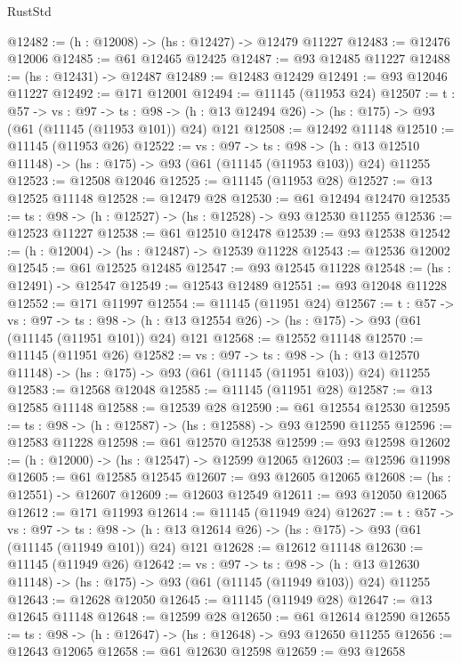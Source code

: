 \begin{lexlean}{RustStd}
\begin{coremodule}
@12482 := (h : @12008) -> (hs : @12427) -> @12479 @11227
@12483 := @12476 @12006
@12485 := @61 @12465 @12425
@12487 := @93 @12485 @11227
@12488 := (hs : @12431) -> @12487
@12489 := @12483 @12429
@12491 := @93 @12046 @11227
@12492 := @171 @12001
@12494 := @11145 (@11953 @24)
@12507 := {t : @57} ->
  {vs : @97} ->
  {ts : @98} -> (h : @13 @12494 @26) -> (hs : @175) -> @93 (@61 (@11145 (@11953 @101)) @24) @121
@12508 := @12492 @11148
@12510 := @11145 (@11953 @26)
@12522 := {vs : @97} ->
  {ts : @98} ->
  (h : @13 @12510 @11148) -> (hs : @175) -> @93 (@61 (@11145 (@11953 @103)) @24) @11255
@12523 := @12508 @12046
@12525 := @11145 (@11953 @28)
@12527 := @13 @12525 @11148
@12528 := @12479 @28
@12530 := @61 @12494 @12470
@12535 := {ts : @98} -> (h : @12527) -> (hs : @12528) -> @93 @12530 @11255
@12536 := @12523 @11227
@12538 := @61 @12510 @12478
@12539 := @93 @12538
@12542 := (h : @12004) -> (hs : @12487) -> @12539 @11228
@12543 := @12536 @12002
@12545 := @61 @12525 @12485
@12547 := @93 @12545 @11228
@12548 := (hs : @12491) -> @12547
@12549 := @12543 @12489
@12551 := @93 @12048 @11228
@12552 := @171 @11997
@12554 := @11145 (@11951 @24)
@12567 := {t : @57} ->
  {vs : @97} ->
  {ts : @98} -> (h : @13 @12554 @26) -> (hs : @175) -> @93 (@61 (@11145 (@11951 @101)) @24) @121
@12568 := @12552 @11148
@12570 := @11145 (@11951 @26)
@12582 := {vs : @97} ->
  {ts : @98} ->
  (h : @13 @12570 @11148) -> (hs : @175) -> @93 (@61 (@11145 (@11951 @103)) @24) @11255
@12583 := @12568 @12048
@12585 := @11145 (@11951 @28)
@12587 := @13 @12585 @11148
@12588 := @12539 @28
@12590 := @61 @12554 @12530
@12595 := {ts : @98} -> (h : @12587) -> (hs : @12588) -> @93 @12590 @11255
@12596 := @12583 @11228
@12598 := @61 @12570 @12538
@12599 := @93 @12598
@12602 := (h : @12000) -> (hs : @12547) -> @12599 @12065
@12603 := @12596 @11998
@12605 := @61 @12585 @12545
@12607 := @93 @12605 @12065
@12608 := (hs : @12551) -> @12607
@12609 := @12603 @12549
@12611 := @93 @12050 @12065
@12612 := @171 @11993
@12614 := @11145 (@11949 @24)
@12627 := {t : @57} ->
  {vs : @97} ->
  {ts : @98} -> (h : @13 @12614 @26) -> (hs : @175) -> @93 (@61 (@11145 (@11949 @101)) @24) @121
@12628 := @12612 @11148
@12630 := @11145 (@11949 @26)
@12642 := {vs : @97} ->
  {ts : @98} ->
  (h : @13 @12630 @11148) -> (hs : @175) -> @93 (@61 (@11145 (@11949 @103)) @24) @11255
@12643 := @12628 @12050
@12645 := @11145 (@11949 @28)
@12647 := @13 @12645 @11148
@12648 := @12599 @28
@12650 := @61 @12614 @12590
@12655 := {ts : @98} -> (h : @12647) -> (hs : @12648) -> @93 @12650 @11255
@12656 := @12643 @12065
@12658 := @61 @12630 @12598
@12659 := @93 @12658

\end{coremodule}
\end{lexlean}
